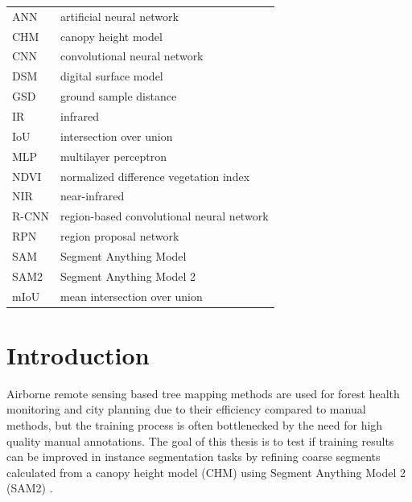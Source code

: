 \documentclass[english, 12pt, a4paper, sci, utf8, a-2b, online]{aaltothesis}
\begin{document}


\begin{tabular}{ll}
ANN & artificial neural network \\
CHM & canopy height model \\
CNN & convolutional neural network \\
DSM & digital surface model \\
GSD & ground sample distance \\
IR & infrared \\
IoU & intersection over union \\
MLP & multilayer perceptron \\
NDVI & normalized difference vegetation index \\
NIR & near-infrared \\
R-CNN & region-based convolutional neural network \\
RPN & region proposal network \\
SAM & Segment Anything Model \\
SAM2 & Segment Anything Model 2 \\
mIoU & mean intersection over union \\
\end{tabular}

\cleardoublepage

\section{Introduction}
\label{sec:intro}

\thispagestyle{empty}

Airborne remote sensing based tree mapping methods are used for forest health monitoring \cite{ecke} and city planning \cite{velasquez} due to their efficiency compared to manual methods, but the training process is often bottlenecked by the need for high quality manual annotations. 
The goal of this thesis is to test if training results can be improved in instance segmentation tasks by refining coarse segments calculated from a canopy height model (CHM) using Segment Anything Model 2 (SAM2) \cite{sam2}.
\end{document}
